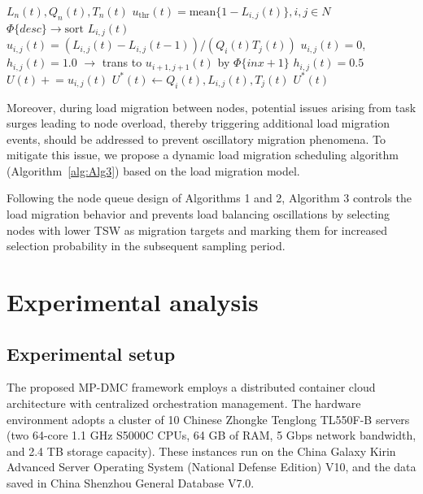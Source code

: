\documentclass[twoside,twocolumn]{article}
\begin{document}
\begin{algorithm}[h!]
	\small
	\centering
	\caption{Load migration scheduling algorithm}
	\label{alg:Alg3}
	\begin{algorithmic}[1]
	\REQUIRE $L_n(t), Q_n(t), T_n(t)$
	    \STATE $u_{\mathrm{thr}}(t) = \text{mean}\{1-L_{i,j}(t)\}, i,j \in N$
	    \STATE $\Phi\{desc\} \rightarrow \text{sort } L_{i,j}(t)$
	        \STATE $u_{i,j}(t) = \left(L_{i,j}(t)-L_{i,j}(t-1)\right) / \left(Q_i(t)T_j(t)\right)$
	                \STATE $u_{i,j}(t) = 0$, $h_{i,j}(t) = 1.0$
	                \STATE $\rightarrow$ trans to $u_{i+1,j+1}(t)$ by $\Phi\{inx+1\}$
	            \ELSE
	                \STATE $h_{i,j}(t) = 0.5$
	            \ENDIF
	        \ENDWHILE
	        \STATE $U(t) \mathrel{+}= u_{i,j}(t)$
	    \ENDFOR
	    \STATE $U^{*}(t) \leftarrow Q_i(t), L_{i,j}(t), T_j(t)$
	\ENDFOR
	\RETURN $U^{*}(t)$
	\end{algorithmic}
\end{algorithm}

Moreover, during load migration between nodes, potential issues arising from task surges leading to node overload, thereby triggering additional load migration events, should be addressed to prevent oscillatory migration phenomena. To mitigate this issue, we propose a dynamic load migration scheduling algorithm (Algorithm~\ref{alg:Alg3}) based on the load migration model.

Following the node queue design of Algorithms 1 and 2, Algorithm 3 controls the load migration behavior and prevents load balancing oscillations by selecting nodes with lower TSW as migration targets and marking them for increased selection probability in the subsequent sampling period.

\section{Experimental analysis}

\subsection{Experimental setup}

The proposed MP-DMC framework employs a distributed container cloud architecture with centralized orchestration management. The hardware environment adopts a cluster of 10 Chinese Zhongke Tenglong TL550F-B servers (two 64-core 1.1 GHz S5000C CPUs, 64 GB of RAM, 5 Gbps network bandwidth, and 2.4 TB storage capacity). These instances run on the China Galaxy Kirin Advanced Server Operating System (National Defense Edition) V10, and the data saved in China Shenzhou General Database V7.0.
\end{document}
